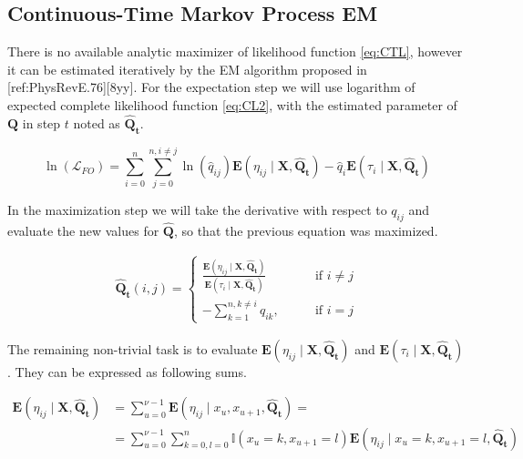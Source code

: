 \documentclass[thesis=M,english]{FITthesis}[2012/10/20]
\newcommand{\matr}[1]{\mathbf{#1}}
\begin{document}
\subsection{Continuous-Time Markov Process EM} 

There is no available analytic maximizer of likelihood function \eqref{eq:CTL}, however it can be estimated iteratively by the EM algorithm proposed in [ref:PhysRevE.76][8yy].  
For the expectation step we will use logarithm of expected complete likelihood function \eqref{eq:CL2}, with the estimated parameter of $\matr{Q}$ in step $t$ noted as $\matr{ \hat Q_t } $.

\begin{equation}\label{eq:EMCL}
 \ln( \mathcal{L}_{FO} ) = \sum_{i=0}^n \sum_{j=0}^{n, i \neq j} \ln( \hat q_{ij}) \mathbf{E}( \eta_{ij} \mid \matr{X}, \matr{ \hat Q_t } ) - \hat q_i \mathbf{E}( \tau_i \mid \matr{X}, \matr{ \hat Q_t } )
\end{equation}

In the maximization step we will take the derivative with respect to $q_{ij}$ and evaluate the new values for $\matr{ \hat Q }$, so that the previous equation was maximized. 

\begin{equation}\label{eq:Qmax}
\begin{aligned}  
\matr{ \hat Q_t }(i,j)= 
\begin{cases}
\frac{ \mathbf{E}(\eta_{ij} \mid \matr{X}, \matr{ \hat Q_t } )}{ \mathbf{E}( \tau_i \mid \matr{X}, \matr{\hat Q_t} ) } & \text{if } i\neq j\\
- \sum\limits_{k=1}^{n,k \neq i} q_{ik}, \qquad & \text{if } i=j
\end{cases}
\end{aligned}
\end{equation}

The remaining non-trivial task is to evaluate $\mathbf{E}( \eta_{ij} \mid \matr{X}, \matr{\hat Q_t} )$ and $\mathbf{E}( \tau_i \mid \matr{X}, \matr{ \hat Q_t } )$. They can be expressed as following sums.


\begin{equation}
\begin{aligned}  
\mathbf{E}(\eta_{ij} \mid \matr{X}, \matr{\hat Q_t} ) &= \sum_{u=0}^{\nu-1} \mathbf{E}(\eta_{ij} \mid x_u, x_{u+1}, \matr{ \hat Q_t } ) = \\
&= \sum_{u=0}^{\nu-1} \sum_{k=0,l=0}^{n} \mathbb{I}( x_u = k, x_{u+1} = l ) \mathbf{E}(\eta_{ij} \mid x_u = k, x_{u+1} = l, \matr{\hat Q_t} )
\end{aligned}
\end{equation}
\end{document}
